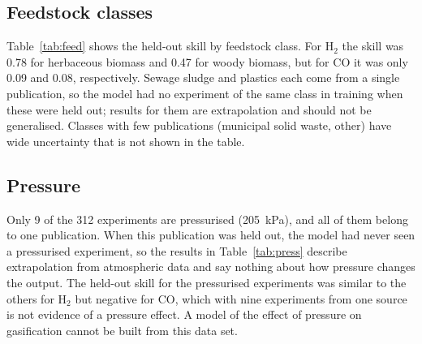 \documentclass[11pt,a4paper]{article}
\begin{document}
\subsection{Feedstock classes}
Table~\ref{tab:feed} shows the held-out skill by feedstock class. For H$_2$ the skill was 0.78 for herbaceous biomass and 0.47 for woody biomass, but for CO it was only 0.09 and 0.08, respectively. Sewage sludge and plastics each come from a single publication, so the model had no experiment of the same class in training when these were held out; results for them are extrapolation and should not be generalised. Classes with few publications (municipal solid waste, other) have wide uncertainty that is not shown in the table.

\begin{table}[H]\centering\footnotesize\caption{Held-out skill of the random forest by feedstock class ($n$ experiments, $N$ publications for H$_2$; $n$ differs slightly for other targets).}\label{tab:feed}
\end{table}

\subsection{Pressure}
Only 9 of the 312 experiments are pressurised (205~kPa), and all of them belong to one publication. When this publication was held out, the model had never seen a pressurised experiment, so the results in Table~\ref{tab:press} describe extrapolation from atmospheric data and say nothing about how pressure changes the output. The held-out skill for the pressurised experiments was similar to the others for H$_2$ but negative for CO, which with nine experiments from one source is not evidence of a pressure effect. A model of the effect of pressure on gasification cannot be built from this data set.
\end{document}
